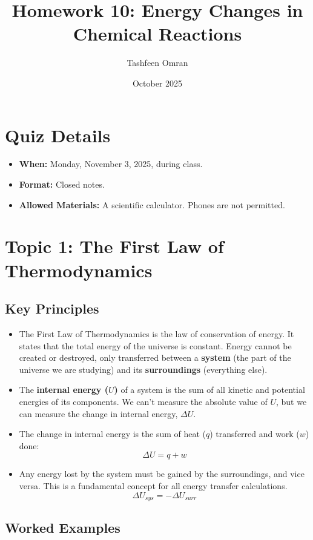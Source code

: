 \documentclass{article}
\title{Homework 10: Energy Changes in Chemical Reactions}
\author{Tashfeen Omran}
\date{October 2025}
\begin{document}
\maketitle

\section*{Quiz Details}
\begin{itemize}
    \item \textbf{When:} Monday, November 3, 2025, during class.
    \item \textbf{Format:} Closed notes.
    \item \textbf{Allowed Materials:} A scientific calculator. Phones are not permitted.
\end{itemize}

\section{Topic 1: The First Law of Thermodynamics}
\subsection{Key Principles}
\begin{itemize}
    \item The First Law of Thermodynamics is the law of conservation of energy. It states that the total energy of the universe is constant. Energy cannot be created or destroyed, only transferred between a \textbf{system} (the part of the universe we are studying) and its \textbf{surroundings} (everything else).
    \item The \textbf{internal energy ($U$)} of a system is the sum of all kinetic and potential energies of its components. We can't measure the absolute value of $U$, but we can measure the change in internal energy, $\Delta U$.
    \item The change in internal energy is the sum of heat ($q$) transferred and work ($w$) done:
    \[ \Delta U = q + w \]
    \item Any energy lost by the system must be gained by the surroundings, and vice versa. This is a fundamental concept for all energy transfer calculations.
    \[ \Delta U_{sys} = -\Delta U_{surr} \]
\end{itemize}

\subsection{Worked Examples}
\end{document}
